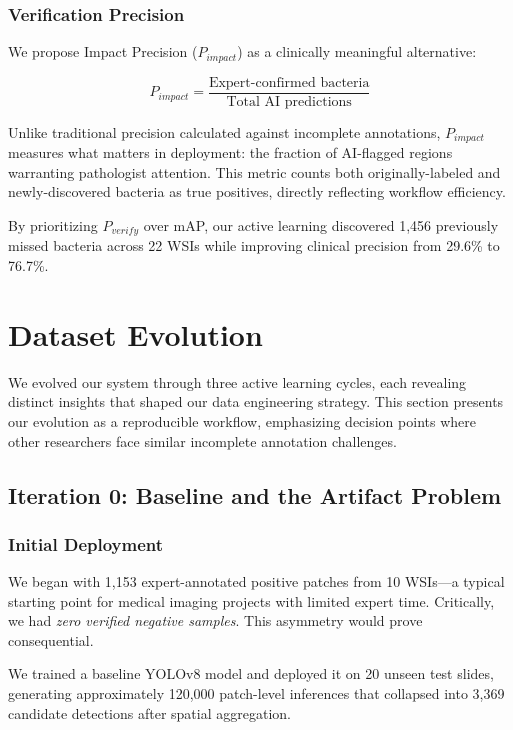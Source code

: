 \documentclass[conference]{IEEEtran}
\begin{document}
\subsubsection{Verification Precision}

We propose Impact Precision ($P_{impact}$) as a clinically meaningful alternative:

\begin{equation}
P_{impact} = \frac{\text{Expert-confirmed bacteria}}{\text{Total AI predictions}}
\end{equation}

Unlike traditional precision calculated against incomplete annotations, $P_{impact}$ measures what matters in deployment: the fraction of AI-flagged regions warranting pathologist attention. This metric counts both originally-labeled and newly-discovered bacteria as true positives, directly reflecting workflow efficiency.

By prioritizing $P_{verify}$ over mAP, our active learning discovered 1,456 previously missed bacteria across 22 WSIs while improving clinical precision from 29.6\% to 76.7\%.

\section{Dataset Evolution}

We evolved our system through three active learning cycles, each revealing distinct insights that shaped our data engineering strategy. This section presents our evolution as a reproducible workflow, emphasizing decision points where other researchers face similar incomplete annotation challenges.

\subsection{Iteration 0: Baseline and the Artifact Problem}

\subsubsection{Initial Deployment}

We began with 1,153 expert-annotated positive patches from 10 WSIs—a typical starting point for medical imaging projects with limited expert time. Critically, we had \textit{zero verified negative samples}. This asymmetry would prove consequential.

We trained a baseline YOLOv8 model and deployed it on 20 unseen test slides, generating approximately 120,000 patch-level inferences that collapsed into 3,369 candidate detections after spatial aggregation.
\end{document}
